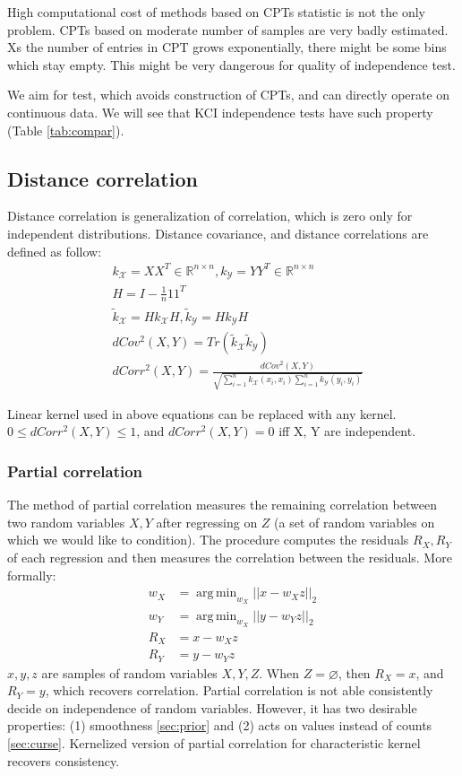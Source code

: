 \documentclass{article} %
\DeclareMathOperator*{\argmin}{arg\,min}
\begin{document}
High computational cost of methods based on CPTs statistic is not the only problem. 
CPTs based on moderate number of samples are very badly estimated. Xs the number
of entries in CPT grows exponentially, there might be some bins which stay empty. This might
be very dangerous for quality of independence test.

We aim for test, which avoids construction of CPTs, and can directly operate on continuous data.
We will see that KCI independence tests have such property (Table \ref{tab:compar}).

\subsection{Distance correlation}\label{sec:dist}
Distance correlation \cite{szekely2007measuring} is generalization of correlation, which is zero only for independent distributions.
Distance covariance, and distance correlations are defined as follow:
\begin{align*}
  &k_\mathcal{X} = XX^T \in \mathbb{R}^{n \times n},
  k_\mathcal{Y} = YY^T \in \mathbb{R}^{n \times n}\\
  &H = I - \frac{1}{n}11^T \\
  &\tilde{k}_\mathcal{X} = Hk_{\mathcal{X}}H, 
  \tilde{k}_\mathcal{Y} = Hk_{\mathcal{Y}}H \\
  &dCov^2(X, Y) = Tr(\tilde{k}_\mathcal{X}\tilde{k}_\mathcal{Y}) \\
  &dCorr^2(X, Y) = \frac{dCov^2(X, Y)}{\sqrt{\sum_{i=1}^nk_{\mathcal{X}}(x_i, x_i) \sum_{i=1}^nk_{\mathcal{Y}}(y_i, y_i)}} 
\end{align*}

Linear kernel used in above equations can be replaced with any kernel. $0 \leq dCorr^2(X, Y) \leq 1$, and $dCorr^2(X, Y) = 0$ iff X, Y are independent. 

\subsubsection{Partial correlation}\label{sec:corr}
The method of partial correlation measures the remaining correlation between two random variables $X, Y$ after regressing on $Z$ (a set of random 
variables on which we would like to condition).  The procedure computes the residuals $R_X, R_Y$ of each regression and then measures the correlation between the residuals. More formally:
\begin{align*}
  w_X &= \argmin_{w_X} ||x - w_X z||_{2} \\
  w_Y &= \argmin_{w_X} ||y - w_Y z||_{2} \\
  R_X &= x - w_X z \\
  R_Y &= y - w_Y z
\end{align*}
$x, y, z$ are samples of random variables $X, Y, Z$. When $Z = \varnothing$, then $R_X = x$, and $R_Y = y$, which
recovers correlation. Partial correlation is not able consistently decide
on independence of random variables. However, it has two desirable properties: (1) smoothness \ref{sec:prior} and (2)
acts on values instead of counts \ref{sec:curse}. Kernelized version of partial correlation for 
characteristic kernel recovers consistency.
\end{document}
